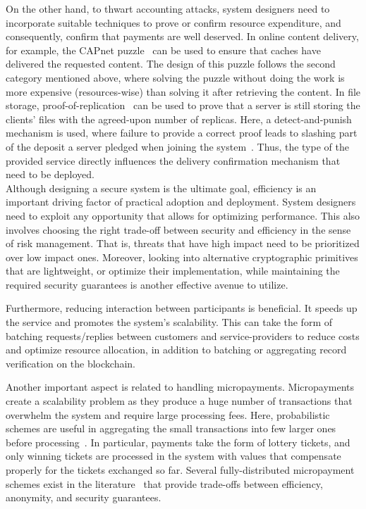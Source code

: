 \documentclass{llncs}
\begin{document}
On the other hand, to thwart accounting attacks, system designers need to incorporate suitable techniques to prove or confirm resource expenditure, and consequently, confirm that payments are well deserved. In online content delivery, for example, the CAPnet puzzle~\cite{Almashaqbeh19b} can be used to ensure that caches have delivered the requested content. The design of this puzzle follows the second category mentioned above, where solving the puzzle without doing the work is more expensive (resources-wise) than solving it after retrieving the content. In file storage, proof-of-replication~\cite{Fisch19} can be used to prove that a server is still storing the clients’ files with the agreed-upon number of replicas. Here, a detect-and-punish mechanism is used, where failure to provide a correct proof leads to slashing part of the deposit a server pledged when joining the system~\cite{filecoin}. Thus, the type of the provided service directly influences the delivery confirmation mechanism that need to be deployed. \\


 Although designing a secure system is the ultimate goal, efficiency is an important driving factor of practical adoption and deployment. System designers need to exploit any opportunity that allows for optimizing performance. This also involves choosing the right trade-off between security and efficiency in the sense of risk management. That is, threats that have high impact need to be prioritized over low impact ones. Moreover, looking into alternative cryptographic primitives that are lightweight, or optimize their implementation, while maintaining the required security guarantees is another effective avenue to utilize.


Furthermore, reducing interaction between participants is beneficial. It speeds up the service and promotes the system’s scalability. This can take the form of batching requests/replies between customers and service-providers to reduce costs and optimize resource allocation, in addition to batching or aggregating record verification on the blockchain.


Another important aspect is related to handling micropayments. Micropayments create a scalability problem as they produce a huge number of transactions that overwhelm the system and require large processing fees. Here, probabilistic schemes are useful in aggregating the small transactions into few larger ones before processing~\cite{Wheeler96,Rivest97}. In particular, payments take the form of lottery tickets, and only winning tickets are processed in the system with values that compensate properly for the tickets exchanged so far. Several fully-distributed micropayment schemes exist in the literature~\cite{Pass15,Chiesa17,Almashaqbeh20} that provide trade-offs between efficiency, anonymity, and security guarantees. \\
\end{document}
